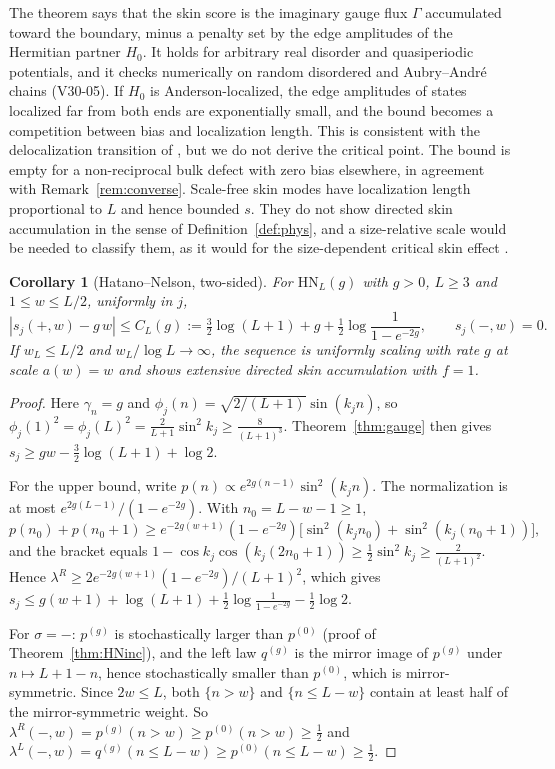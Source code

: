 \documentclass[11pt]{article}
\newtheorem{corollary}[theorem]{Corollary}
\theoremstyle{definition}
\theoremstyle{remark}
\begin{document}
The theorem says that the skin score is the imaginary gauge flux $\Gamma$ \cite{HN96} accumulated toward the boundary, minus a penalty set by the edge amplitudes of the Hermitian partner $H_0$. It holds for arbitrary real disorder and quasiperiodic potentials, and it checks numerically on random disordered and Aubry--Andr\'e chains (V30-05). If $H_0$ is Anderson-localized, the edge amplitudes of states localized far from both ends are exponentially small, and the bound becomes a competition between bias and localization length. This is consistent with the delocalization transition of \cite{HN96,JLYZC19}, but we do not derive the critical point. The bound is empty for a non-reciprocal bulk defect with zero bias elsewhere, in agreement with Remark~\ref{rem:converse}. Scale-free skin modes \cite{LLG21} have localization length proportional to $L$ and hence bounded $s$. They do not show directed skin accumulation in the sense of Definition~\ref{def:phys}, and a size-relative scale would be needed to classify them, as it would for the size-dependent critical skin effect \cite{LLMG20}.

\begin{corollary}[Hatano--Nelson, two-sided]\label{cor:HN}
For $\mathrm{HN}_L(g)$ with $g>0$, $L\ge3$ and $1\le w\le L/2$, uniformly in $j$,
\[
|s_j(+,w)-g\,w|\le C_L(g):=\tfrac32\log(L+1)+g+\tfrac12\log\frac{1}{1-e^{-2g}},\qquad s_j(-,w)=0 .
\]
If $w_L\le L/2$ and $w_L/\log L\to\infty$, the sequence is uniformly scaling with rate $g$ at scale $a(w)=w$ and shows extensive directed skin accumulation with $f=1$.
\end{corollary}
\begin{proof}
Here $\gamma_n=g$ and $\phi_j(n)=\sqrt{2/(L+1)}\sin(k_jn)$, so $\phi_j(1)^2=\phi_j(L)^2=\frac{2}{L+1}\sin^2k_j\ge\frac{8}{(L+1)^3}$. Theorem~\ref{thm:gauge} then gives $s_j\ge gw-\frac32\log(L+1)+\log2$.

For the upper bound, write $p(n)\propto e^{2g(n-1)}\sin^2(k_jn)$. The normalization is at most $e^{2g(L-1)}/(1-e^{-2g})$. With $n_0=L-w-1\ge1$,
\[
p(n_0)+p(n_0+1)\ge e^{-2g(w+1)}(1-e^{-2g})\bigl[\sin^2(k_jn_0)+\sin^2(k_j(n_0+1))\bigr],
\]
and the bracket equals $1-\cos k_j\cos(k_j(2n_0+1))\ge\frac12\sin^2k_j\ge\frac2{(L+1)^2}$. Hence $\lambda^R\ge2e^{-2g(w+1)}(1-e^{-2g})/(L+1)^2$, which gives $s_j\le g(w+1)+\log(L+1)+\frac12\log\frac1{1-e^{-2g}}-\frac12\log2$.

For $\sigma=-$: $p^{(g)}$ is stochastically larger than $p^{(0)}$ (proof of Theorem~\ref{thm:HNinc}), and the left law $q^{(g)}$ is the mirror image of $p^{(g)}$ under $n\mapsto L+1-n$, hence stochastically smaller than $p^{(0)}$, which is mirror-symmetric. Since $2w\le L$, both $\{n>w\}$ and $\{n\le L-w\}$ contain at least half of the mirror-symmetric weight. So $\lambda^R(-,w)=p^{(g)}(n>w)\ge p^{(0)}(n>w)\ge\frac12$ and $\lambda^L(-,w)=q^{(g)}(n\le L-w)\ge p^{(0)}(n\le L-w)\ge\frac12$.
\end{proof}
\end{document}
